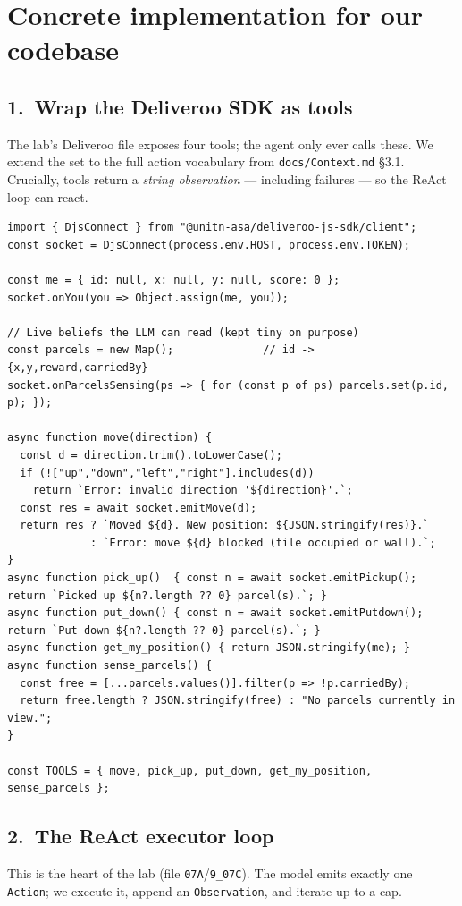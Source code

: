 \documentclass[11pt,a4paper]{article}
\begin{document}
\section{Concrete implementation for our codebase}

\subsection{1.\ Wrap the Deliveroo SDK as tools}
The lab's Deliveroo file exposes four tools; the agent only ever calls these. We extend the
set to the full action vocabulary from \texttt{docs/Context.md} \S3.1. Crucially, tools return
a \emph{string observation} --- including failures --- so the ReAct loop can react.

\begin{lstlisting}
import { DjsConnect } from "@unitn-asa/deliveroo-js-sdk/client";
const socket = DjsConnect(process.env.HOST, process.env.TOKEN);

const me = { id: null, x: null, y: null, score: 0 };
socket.onYou(you => Object.assign(me, you));

// Live beliefs the LLM can read (kept tiny on purpose)
const parcels = new Map();              // id -> {x,y,reward,carriedBy}
socket.onParcelsSensing(ps => { for (const p of ps) parcels.set(p.id, p); });

async function move(direction) {
  const d = direction.trim().toLowerCase();
  if (!["up","down","left","right"].includes(d))
    return `Error: invalid direction '${direction}'.`;
  const res = await socket.emitMove(d);
  return res ? `Moved ${d}. New position: ${JSON.stringify(res)}.`
             : `Error: move ${d} blocked (tile occupied or wall).`;
}
async function pick_up()  { const n = await socket.emitPickup();  return `Picked up ${n?.length ?? 0} parcel(s).`; }
async function put_down() { const n = await socket.emitPutdown(); return `Put down ${n?.length ?? 0} parcel(s).`; }
async function get_my_position() { return JSON.stringify(me); }
async function sense_parcels() {
  const free = [...parcels.values()].filter(p => !p.carriedBy);
  return free.length ? JSON.stringify(free) : "No parcels currently in view.";
}

const TOOLS = { move, pick_up, put_down, get_my_position, sense_parcels };
\end{lstlisting}

\subsection{2.\ The ReAct executor loop}
This is the heart of the lab (file \texttt{07A}/\texttt{9\_07C}). The model emits exactly one
\texttt{Action}; we execute it, append an \texttt{Observation}, and iterate up to a cap.
\end{document}
